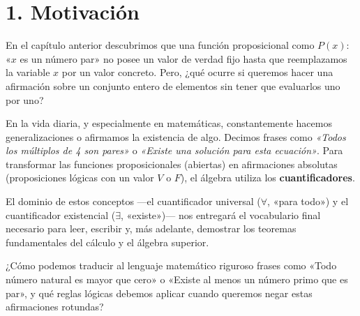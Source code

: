 \documentclass[11pt]{article}
\newenvironment{motivacion}{\section*{1. Motivación}}{}
\newenvironment{preguntaguia}{\begin{tcolorbox}[colback=cyan!5,colframe=cyan!75!black,title=Pregunta Guía]}{\end{tcolorbox}}
\begin{document}
\begin{motivacion}
  En el capítulo anterior descubrimos que una función proposicional como $P(x):$ «$x$ es un número par» no posee un valor de verdad fijo hasta que reemplazamos la variable $x$ por un valor concreto. Pero, ¿qué ocurre si queremos hacer una afirmación sobre un conjunto entero de elementos sin tener que evaluarlos uno por uno?

  En la vida diaria, y especialmente en matemáticas, constantemente hacemos generalizaciones o afirmamos la existencia de algo. Decimos frases como \textit{«Todos los múltiplos de 4 son pares»} o \textit{«Existe una solución para esta ecuación»}. Para transformar las funciones proposicionales (abiertas) en afirmaciones absolutas (proposiciones lógicas con un valor $V$ o $F$), el álgebra utiliza los \textbf{cuantificadores}. 

  El dominio de estos conceptos —el cuantificador universal ($\forall$, «para todo») y el cuantificador existencial ($\exists$, «existe»)— nos entregará el vocabulario final necesario para leer, escribir y, más adelante, demostrar los teoremas fundamentales del cálculo y el álgebra superior.

  \begin{preguntaguia}
    ¿Cómo podemos traducir al lenguaje matemático riguroso frases como «Todo número natural es mayor que cero» o «Existe al menos un número primo que es par», y qué reglas lógicas debemos aplicar cuando queremos negar estas afirmaciones rotundas?
  \end{preguntaguia}
\end{motivacion}
\end{document}
